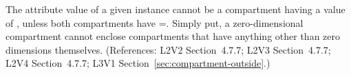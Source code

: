 The  attribute value of a given \Compartment
instance cannot be a compartment having a  value of
, unless both compartments have =.
Simply put, a zero-dimensional compartment cannot enclose compartments that
have anything other than zero dimensions themselves.  (References: L2V2
Section~4.7.7; L2V3 Section~4.7.7; L2V4 Section~4.7.7; L3V1 Section~\ref{sec:compartment-outside}.)
